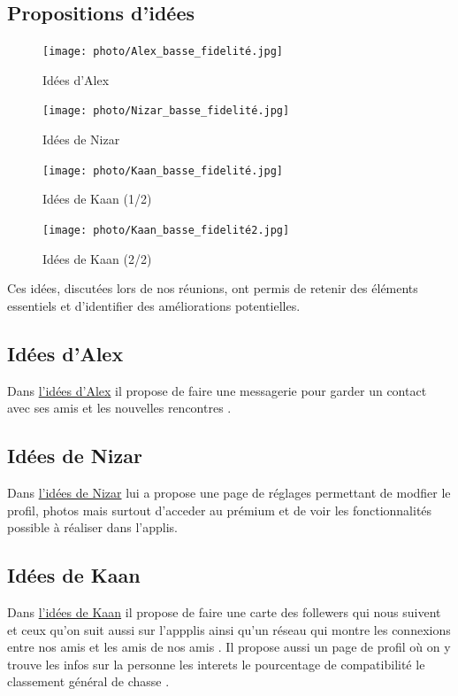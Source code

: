 \documentclass{article}
\begin{document}
\subsection{Propositions d’idées}
\begin{figure}[H]
    \centering
    \begin{minipage}{0.4\textwidth}
        \centering
        \texttt{[image: photo/Alex\_basse\_fidelité.jpg]}
        \caption{Idées d'Alex}
        \label{fig:Alex}
    \end{minipage}
    \hfill
    \begin{minipage}{0.4\textwidth}
        \centering
        \texttt{[image: photo/Nizar\_basse\_fidelité.jpg]}
        \caption{Idées de Nizar}
        \label{fig:Nizar}
    \end{minipage}
    \begin{minipage}{0.4\textwidth}
        \centering
        \texttt{[image: photo/Kaan\_basse\_fidelité.jpg]}
        \caption{Idées de Kaan (1/2)}
    \end{minipage}
    \hfill
    \begin{minipage}{0.4\textwidth}
        \centering
        \texttt{[image: photo/Kaan\_basse\_fidelité2.jpg]}
        \caption{Idées de Kaan (2/2)}
        \label{fig:Kaan}
    \end{minipage}
\end{figure}

Ces idées, discutées lors de nos réunions, ont permis de retenir des éléments essentiels 
et d’identifier des améliorations potentielles. 

\newpage
\subsection{Idées d'Alex}
Dans \hyperref[fig:Alex]{l'idées d'Alex} il propose  de faire une messagerie pour garder
 un contact avec ses amis et les nouvelles rencontres .

\subsection{Idées de Nizar}
Dans \hyperref[fig:Nizar]{l'idées de Nizar} lui a propose une page de réglages permettant de 
modfier le profil, photos mais surtout
d'acceder au prémium et de voir les fonctionnalités possible à réaliser dans l'applis.

\subsection{Idées de Kaan}
Dans \hyperref[fig:Kaan]{l'idées de Kaan} il propose de faire une carte des follewers qui nous suivent et ceux qu'on suit aussi  sur l'appplis ainsi qu'un
réseau qui montre les connexions entre nos amis et les amis de nos amis . Il propose aussi un page de profil où on y trouve 
les infos sur la personne les interets le pourcentage de compatibilité  le classement général de chasse . 
\end{document}
